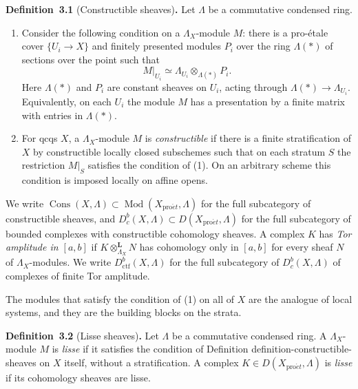 \documentclass[11pt]{article}
\newenvironment{bpstatement}[2]{\par\addvspace{0.6\baselineskip}\noindent\textbf{#1}#2\textbf{.}\enspace\ignorespaces}
  {\par\addvspace{0.4\baselineskip}}
\providecommand{\Cons}{}\renewcommand{\Cons}{\operatorname{Cons}}
\providecommand{\Dbc}{}\renewcommand{\Dbc}{D^b_c}
\begin{document}
\label{bp7}%
\begin{bpstatement}{Definition~3.1}{ (Constructible sheaves)}
Let \(\Lambda\) be a commutative condensed ring.

\begin{enumerate}
\item Consider the following condition on a \(\Lambda_X\)-module \(M\): there is a pro-étale cover \(\{U_i\to X\}\) and finitely presented modules \(P_i\) over the ring \(\Lambda(*)\) of sections over the point such that \[
   M|_{U_i}\simeq\Lambda_{U_i}\otimes_{\Lambda(*)}P_i.
   \] Here \(\Lambda(*)\) and \(P_i\) are constant sheaves on \(U_i\), acting through \(\Lambda(*)\to\Lambda_{U_i}\). Equivalently, on each \(U_i\) the module \(M\) has a presentation by a finite matrix with entries in \(\Lambda(*)\).
\item For qcqs \(X\), a \(\Lambda_X\)-module \(M\) is \emph{constructible} if there is a finite stratification of \(X\) by constructible locally closed subschemes such that on each stratum \(S\) the restriction \(M|_S\) satisfies the condition of (1). On an arbitrary scheme this condition is imposed locally on affine opens.
\end{enumerate}

We write \(\Cons(X,\Lambda)\subset\operatorname{Mod}(X_{\mathrm{pro}\acute{e}t},\Lambda)\) for the full subcategory of constructible sheaves, and \(\Dbc(X,\Lambda)\subset
D(X_{\mathrm{pro}\acute{e}t},\Lambda)\) for the full subcategory of bounded complexes with constructible cohomology sheaves. A complex \(K\) has \emph{Tor amplitude in \([a,b]\)} if \(K\otimes^{\mathbf L}_{\Lambda_X}N\) has cohomology only in \([a,b]\) for every sheaf \(N\) of \(\Lambda_X\)-modules. We write \(D^b_{\mathrm{ctf}}(X,\Lambda)\) for the full subcategory of \(\Dbc(X,\Lambda)\) of complexes of finite Tor amplitude.
\end{bpstatement}

\label{bp8}%
The modules that satisfy the condition of (1) on all of \(X\) are the analogue of local systems, and they are the building blocks on the strata.

\label{bp9}%
\begin{bpstatement}{Definition~3.2}{ (Lisse sheaves)}
Let \(\Lambda\) be a commutative condensed ring. A \(\Lambda_X\)-module \(M\) is \emph{lisse} if it satisfies the condition of Definition definition-constructible-sheaves on \(X\) itself, without a stratification. A complex \(K\in D(X_{\mathrm{pro}\acute{e}t},\Lambda)\) is \emph{lisse} if its cohomology sheaves are lisse.
\end{bpstatement}
\end{document}
